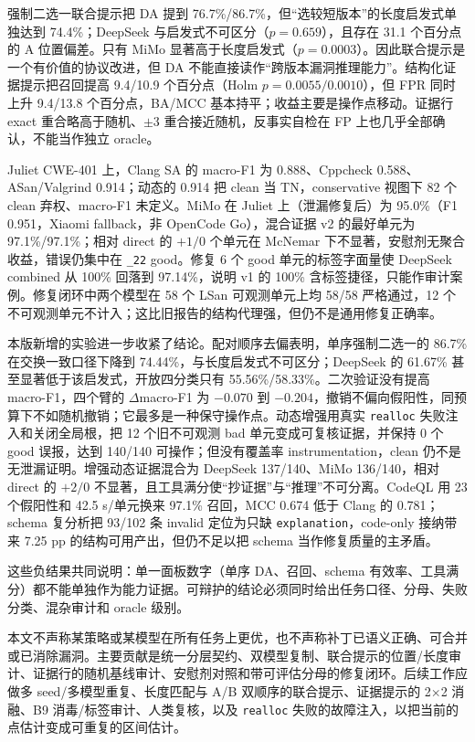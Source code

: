 \documentclass[conference]{IEEEtran}
\begin{document}
强制二选一联合提示把 DA 提到 76.7\%/86.7\%，但“选较短版本”的长度启发式单独达到 74.4\%；DeepSeek 与启发式不可区分（$p=0.659$），且存在 31.1 个百分点的 A 位置偏差。只有 MiMo 显著高于长度启发式（$p=0.0003$）。因此联合提示是一个有价值的协议改进，但 DA 不能直接读作“跨版本漏洞推理能力”。结构化证据提示把召回提高 9.4/10.9 个百分点（Holm $p=0.0055/0.0010$），但 FPR 同时上升 9.4/13.8 个百分点，BA/MCC 基本持平；收益主要是操作点移动。证据行 exact 重合略高于随机、$\pm3$ 重合接近随机，反事实自检在 FP 上也几乎全部确认，不能当作独立 oracle。

Juliet CWE-401 上，Clang SA 的 macro-F1 为 0.888、Cppcheck 0.588、ASan/Valgrind 0.914；动态的 0.914 把 clean 当 TN，conservative 视图下 82 个 clean 弃权、macro-F1 未定义。MiMo 在 Juliet 上（泄漏修复后）为 95.0\%（F1 0.951，Xiaomi fallback，非 OpenCode Go），混合证据 v2 的最好单元为 97.1\%/97.1\%；相对 direct 的 $+1/0$ 个单元在 McNemar 下不显著，安慰剂无聚合收益，错误仍集中在 \texttt{\_22} good。修复 6 个 good 单元的标签字面量使 DeepSeek combined 从 100\% 回落到 97.14\%，说明 v1 的 100\% 含标签捷径，只能作审计案例。修复闭环中两个模型在 58 个 LSan 可观测单元上均 58/58 严格通过，12 个不可观测单元不计入；这比旧报告的结构代理强，但仍不是通用修复正确率。

本版新增的实验进一步收紧了结论。配对顺序去偏表明，单序强制二选一的 86.7\% 在交换一致口径下降到 74.44\%，与长度启发式不可区分；DeepSeek 的 61.67\% 甚至显著低于该启发式，开放四分类只有 55.56\%/58.33\%。二次验证没有提高 macro-F1，四个臂的 $\Delta$macro-F1 为 $-0.070$ 到 $-0.204$，撤销不偏向假阳性，同预算下不如随机撤销；它最多是一种保守操作点。动态增强用真实 \texttt{realloc} 失败注入和关闭全局根，把 12 个旧不可观测 bad 单元变成可复核证据，并保持 0 个 good 误报，达到 140/140 可操作；但没有覆盖率 instrumentation，clean 仍不是无泄漏证明。增强动态证据混合为 DeepSeek 137/140、MiMo 136/140，相对 direct 的 $+2/0$ 不显著，且工具满分使“抄证据”与“推理”不可分离。CodeQL 用 23 个假阳性和 42.5 s/单元换来 97.1\% 召回，MCC 0.674 低于 Clang 的 0.781；schema 复分析把 93/102 条 invalid 定位为只缺 \texttt{explanation}，code-only 接纳带来 7.25 pp 的结构可用产出，但仍不足以把 schema 当作修复质量的主矛盾。

这些负结果共同说明：单一面板数字（单序 DA、召回、schema 有效率、工具满分）都不能单独作为能力证据。可辩护的结论必须同时给出任务口径、分母、失败分类、混杂审计和 oracle 级别。

本文不声称某策略或某模型在所有任务上更优，也不声称补丁已语义正确、可合并或已消除漏洞。主要贡献是统一分层契约、双模型复制、联合提示的位置/长度审计、证据行的随机基线审计、安慰剂对照和带可评估分母的修复闭环。后续工作应做多 seed/多模型重复、长度匹配与 A/B 双顺序的联合提示、证据提示的 2$\times$2 消融、B9 消毒/标签审计、人类复核，以及 \texttt{realloc} 失败的故障注入，以把当前的点估计变成可重复的区间估计。
\end{document}
